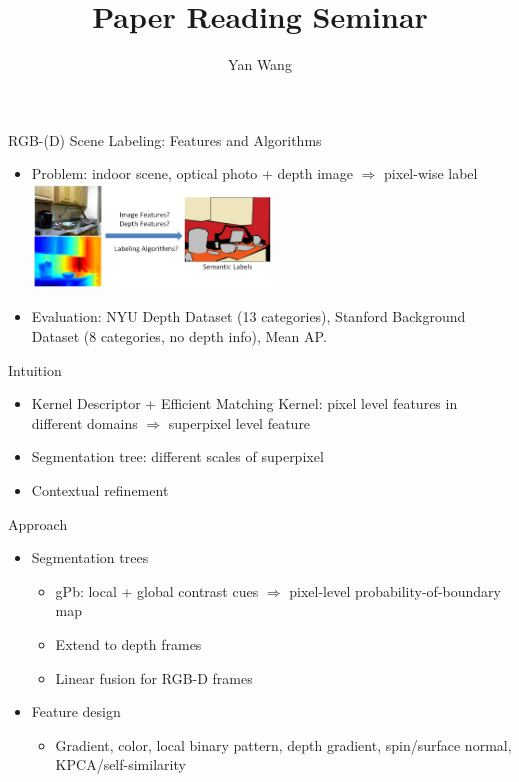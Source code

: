 \documentclass[12pt]{beamer}
\author{Yan Wang}
\title{Paper Reading Seminar}
\subtitle{}
\begin{document}
\begin{frame}[plain]
	\titlepage
\end{frame}

\begin{frame}{RGB-(D) Scene Labeling: Features and Algorithms}
	\begin{itemize}
		\item Problem: indoor scene, optical photo + depth image $\Rightarrow$ pixel-wise label \\
		\medskip
		\includegraphics[width=0.5\textwidth]{fig1.png} \\
		\item Evaluation: NYU Depth Dataset (13 categories), Stanford Background Dataset (8 categories, no depth info), Mean AP.
	\end{itemize}
\end{frame}

\begin{frame}{Intuition}
	\begin{itemize}
		\item Kernel Descriptor + Efficient Matching Kernel: pixel level features in different domains $\Rightarrow$ superpixel level feature
		\item Segmentation tree: different scales of superpixel
		\item Contextual refinement
	\end{itemize}
\end{frame}

\begin{frame}{Approach}
	\begin{itemize}
		\item Segmentation trees
		\begin{itemize}
			\item gPb: local + global contrast cues $\Rightarrow$ pixel-level probability-of-boundary map
			\item Extend to depth frames
			\item Linear fusion for RGB-D frames
		\end{itemize}
		\item Feature design
		\begin{itemize}
			\item Gradient, color, local binary pattern, depth gradient, spin/surface normal, KPCA/self-similarity
		\end{itemize}
	\end{itemize}
\end{frame}
\end{document}
